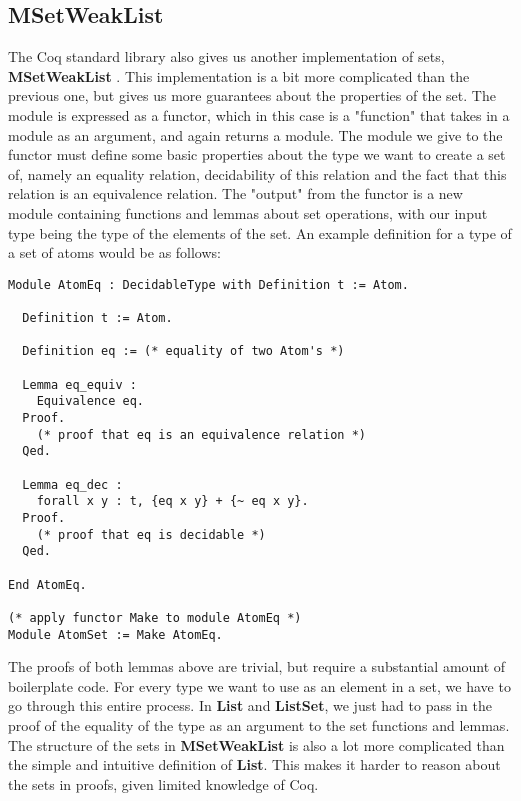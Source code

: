 \subsection{MSetWeakList}
\label{ssec:msetweaklist}

The Coq standard library also gives us another implementation of sets, \textbf{MSetWeakList} \cite{coqmsetweaklist}.
This implementation is a bit more complicated than the previous one,
but gives us more guarantees about the properties of the set.
The module is expressed as a functor, which in this case is a "function" that takes in a module as an argument, and again returns a module.
The module we give to the functor must define some basic properties about the type we want to create a set of,
namely an equality relation, decidability of this relation and the fact that this relation is an equivalence relation.
The "output" from the functor is a new module containing functions and lemmas about set operations,
with our input type being the type of the elements of the set.
An example definition for a type of a set of atoms would be as follows:

\begin{minipage}{\linewidth}
\begin{lstlisting}[language=Coq, label={lst:msetweaklist_ex1}, caption={Set of atoms in \lstinline{MSetWeakList} module}]
Module AtomEq : DecidableType with Definition t := Atom.

  Definition t := Atom.

  Definition eq := (* equality of two Atom's *)

  Lemma eq_equiv :
    Equivalence eq.
  Proof.
    (* proof that eq is an equivalence relation *)
  Qed.

  Lemma eq_dec :
    forall x y : t, {eq x y} + {~ eq x y}.
  Proof.
    (* proof that eq is decidable *)
  Qed.

End AtomEq.

(* apply functor Make to module AtomEq *)
Module AtomSet := Make AtomEq.
\end{lstlisting}
\end{minipage}

The proofs of both lemmas above are trivial, but require a substantial amount of boilerplate code.
For every type we want to use as an element in a set, we have to go through this entire process.
In \textbf{List} and \textbf{ListSet}, we just had to pass in the proof of the equality of the type as an argument to the set functions and lemmas.
The structure of the sets in \textbf{MSetWeakList} is also a lot more complicated than the simple and intuitive definition of \textbf{List}.
This makes it harder to reason about the sets in proofs, given limited knowledge of Coq.

